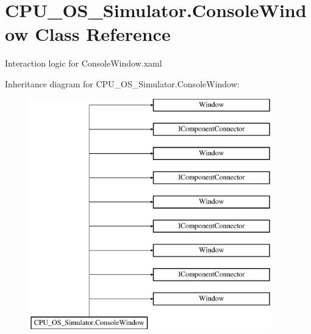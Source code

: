 \hypertarget{class_c_p_u___o_s___simulator_1_1_console_window}{}\section{C\+P\+U\+\_\+\+O\+S\+\_\+\+Simulator.\+Console\+Window Class Reference}
\label{class_c_p_u___o_s___simulator_1_1_console_window}


Interaction logic for Console\+Window.\+xaml  


Inheritance diagram for C\+P\+U\+\_\+\+O\+S\+\_\+\+Simulator.\+Console\+Window\+:\begin{figure}[H]
\begin{center}
\leavevmode
\includegraphics[height=10.000000cm]{class_c_p_u___o_s___simulator_1_1_console_window}
\end{center}
\end{figure}
